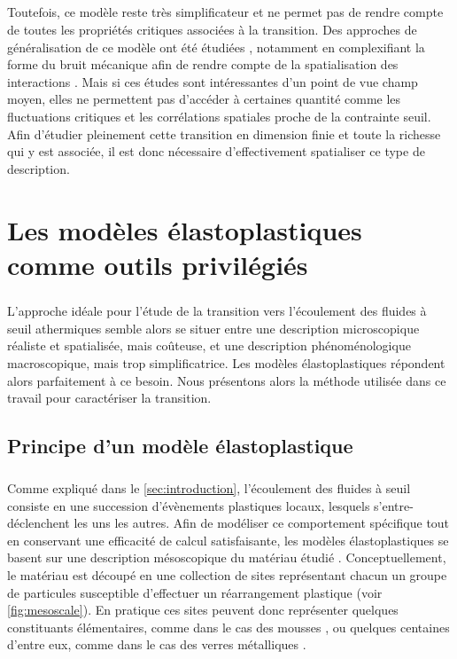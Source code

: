 \subparagraph{}Toutefois, ce modèle reste très simplificateur et ne permet pas de rendre compte de toutes les propriétés critiques associées à la transition. Des approches de généralisation de ce modèle ont été étudiées \cite{agoritsas_relevance_2015, bouchaud_spontaneous_2016}, notamment en complexifiant la forme du bruit mécanique afin de rendre compte de la spatialisation des interactions \cite{lin_mean-field_2016, lin_microscopic_2018}. Mais si ces études sont intéressantes d'un point de vue champ moyen, elles ne permettent pas d'accéder à certaines quantité comme les fluctuations critiques et les corrélations spatiales proche de la contrainte seuil. Afin d'étudier pleinement cette transition en dimension finie et toute la richesse qui y est associée, il est donc nécessaire d'effectivement spatialiser ce type de description. 

\section{Les modèles élastoplastiques comme outils privilégiés}

\subparagraph{}L'approche idéale pour l'étude de la transition vers l'écoulement des fluides à seuil athermiques semble alors se situer entre une description microscopique réaliste et spatialisée, mais coûteuse, et une description phénoménologique macroscopique, mais trop simplificatrice. Les modèles élastoplastiques répondent alors parfaitement à ce besoin. Nous présentons alors la méthode utilisée dans ce travail pour caractériser la transition.

\subsection{Principe d'un modèle élastoplastique}

\subparagraph{}Comme expliqué dans le \autoref{sec:introduction}, l'écoulement des fluides à seuil consiste en une succession d'évènements plastiques locaux, lesquels s'entre-déclenchent les uns les autres. Afin de modéliser ce comportement spécifique tout en conservant une efficacité de calcul satisfaisante, les modèles élastoplastiques se basent sur une description mésoscopique du matériau étudié \cite{nicolas_deformation_2018}. Conceptuellement, le matériau est découpé en une collection de sites représentant chacun un groupe de particules susceptible d'effectuer un réarrangement plastique (voir \autoref{fig:mesoscale}). En pratique ces sites peuvent donc représenter quelques constituants élémentaires, comme dans le cas des mousses \cite{schott_multiscale_2024}, ou quelques centaines d'entre eux, comme dans le cas des verres métalliques \cite{pan_experimental_2008}.

